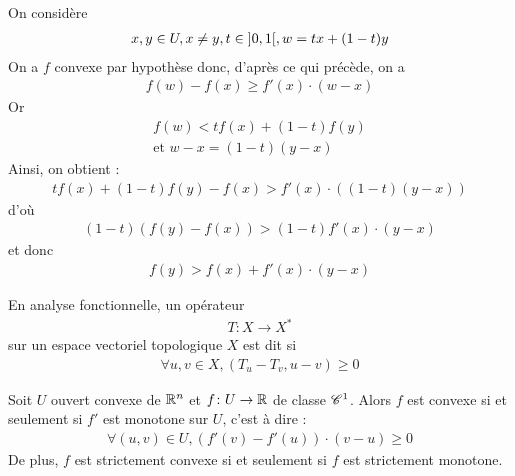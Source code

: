\documentclass[french,a4paper,10pt]{article}
\begin{document}
\begin{myproof}
		On considère 
			\[\begin{aligned}
				x,y\in U,x\ne y,t\in\mathopen{]}0, 1\mathclose{[},w=tx+(1-t)y
			\end{aligned}\]
		On a $f$ convexe par hypothèse donc, d'après ce qui précède, on a
			\[\begin{aligned}
				f(w)-f(x)\ge f'(x)\cdot (w-x)
			\end{aligned}\]
		Or 
			\[\begin{gathered}
				f(w)< tf(x)+(1-t)f(y)\\
				\text{et }w-x=(1-t)(y-x)
			\end{gathered}\]
		Ainsi, on obtient :
			\[\begin{aligned}
				tf(x)+(1-t)f(y)-f(x)>f'(x)\cdot((1-t)(y-x))
			\end{aligned}\]
		d'où
			\[\begin{aligned}
				(1-t)(f(y)-f(x))>(1-t)f'(x)\cdot(y-x)
			\end{aligned}\]
		et donc
			\[\begin{aligned}
				f(y)>f(x)+f'(x)\cdot(y-x)
			\end{aligned}\]
	\end{myproof}
	
	\begin{oc-remark}
		En analyse fonctionnelle, un opérateur 
			\[\begin{aligned}
				T\colon X\to X^\ast
			\end{aligned}\]
		sur un espace vectoriel topologique $X$ est dit  si
			\[\begin{aligned}
				\forall u,v\in X,(T_u-T_v,u-v)\ge 0
			\end{aligned}\]
			
		
	\end{oc-remark}
	\begin{oc-proposition}
		Soit $U$ ouvert convexe de $\mathbb{R}^n$ et $f\colon U\to \mathbb{R}$ de classe $\mathscr{C}^1$. Alors $f$ est convexe si et seulement si $f'$ est monotone sur $U$, c'est à dire :
			\[\begin{aligned}
				\forall (u,v)\in U,(f'(v)-f'(u))\cdot (v-u)\ge 0
			\end{aligned}\]
		De plus, $f$ est strictement convexe si et seulement si $f$ est strictement monotone.
		
	\end{oc-proposition}
\end{document}
